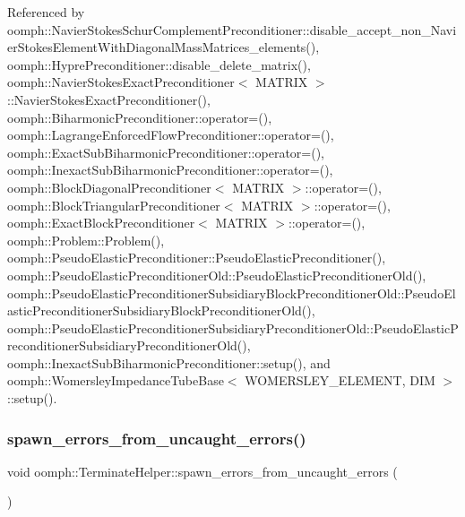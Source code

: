 Referenced by oomph\+::\+Navier\+Stokes\+Schur\+Complement\+Preconditioner\+::disable\+\_\+accept\+\_\+non\+\_\+\+Navier\+Stokes\+Element\+With\+Diagonal\+Mass\+Matrices\+\_\+elements(), oomph\+::\+Hypre\+Preconditioner\+::disable\+\_\+delete\+\_\+matrix(), oomph\+::\+Navier\+Stokes\+Exact\+Preconditioner$<$ M\+A\+T\+R\+I\+X $>$\+::\+Navier\+Stokes\+Exact\+Preconditioner(), oomph\+::\+Biharmonic\+Preconditioner\+::operator=(), oomph\+::\+Lagrange\+Enforced\+Flow\+Preconditioner\+::operator=(), oomph\+::\+Exact\+Sub\+Biharmonic\+Preconditioner\+::operator=(), oomph\+::\+Inexact\+Sub\+Biharmonic\+Preconditioner\+::operator=(), oomph\+::\+Block\+Diagonal\+Preconditioner$<$ M\+A\+T\+R\+I\+X $>$\+::operator=(), oomph\+::\+Block\+Triangular\+Preconditioner$<$ M\+A\+T\+R\+I\+X $>$\+::operator=(), oomph\+::\+Exact\+Block\+Preconditioner$<$ M\+A\+T\+R\+I\+X $>$\+::operator=(), oomph\+::\+Problem\+::\+Problem(), oomph\+::\+Pseudo\+Elastic\+Preconditioner\+::\+Pseudo\+Elastic\+Preconditioner(), oomph\+::\+Pseudo\+Elastic\+Preconditioner\+Old\+::\+Pseudo\+Elastic\+Preconditioner\+Old(), oomph\+::\+Pseudo\+Elastic\+Preconditioner\+Subsidiary\+Block\+Preconditioner\+Old\+::\+Pseudo\+Elastic\+Preconditioner\+Subsidiary\+Block\+Preconditioner\+Old(), oomph\+::\+Pseudo\+Elastic\+Preconditioner\+Subsidiary\+Preconditioner\+Old\+::\+Pseudo\+Elastic\+Preconditioner\+Subsidiary\+Preconditioner\+Old(), oomph\+::\+Inexact\+Sub\+Biharmonic\+Preconditioner\+::setup(), and oomph\+::\+Womersley\+Impedance\+Tube\+Base$<$ W\+O\+M\+E\+R\+S\+L\+E\+Y\+\_\+\+E\+L\+E\+M\+E\+N\+T, D\+I\+M $>$\+::setup().

\mbox{\label{namespaceoomph_1_1TerminateHelper_a9651e6be0ad4ac01e26242c1fd4a66a2}} 
\subsubsection{\texorpdfstring{spawn\+\_\+errors\+\_\+from\+\_\+uncaught\+\_\+errors()}{spawn\_errors\_from\_uncaught\_errors()}}
{\footnotesize\ttfamily void oomph\+::\+Terminate\+Helper\+::spawn\+\_\+errors\+\_\+from\+\_\+uncaught\+\_\+errors (\begin{DoxyParamCaption}{ }\end{DoxyParamCaption})}




